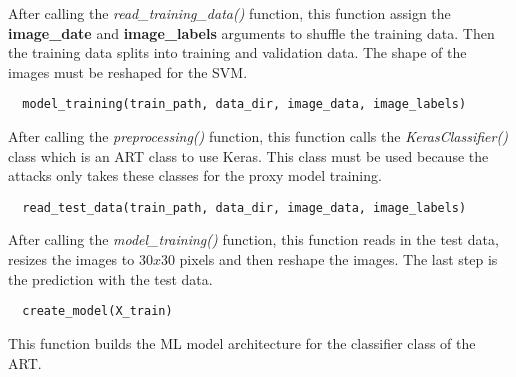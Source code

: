 \noindent After calling the \textit{read\_training\_data()} function, this function assign the \textbf{image\_date} and \textbf{image\_labels} arguments to shuffle the training data. Then the training data splits into training and validation data. The shape of the images must be reshaped for the SVM.

\begin{lstlisting}
  model_training(train_path, data_dir, image_data, image_labels)
\end{lstlisting}

\noindent After calling the \textit{preprocessing()} function, this function calls the \textit{KerasClassifier()} class which is an ART class to use Keras. This class must be used because the attacks only takes these classes for the proxy model training.

\begin{lstlisting}
  read_test_data(train_path, data_dir, image_data, image_labels)
\end{lstlisting}

\noindent After calling the \textit{model\_training()} function, this function reads in the test data, resizes the images to $30x30$ pixels and then reshape the images. The last step is the prediction with the test data.

\begin{lstlisting}
  create_model(X_train)
\end{lstlisting}

\noindent This function builds the ML model architecture for the classifier class of the ART.
